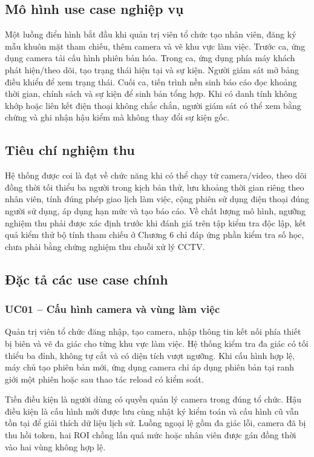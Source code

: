 \subsection{Mô hình use case nghiệp vụ}
Một luồng điển hình bắt đầu khi quản trị viên tổ chức tạo nhân viên, đăng ký mẫu khuôn mặt tham chiếu, thêm camera và vẽ khu vực làm việc. Trước ca, ứng dụng camera tải cấu hình phiên bản hóa. Trong ca, ứng dụng phía máy khách phát hiện/theo dõi, tạo trạng thái hiện tại và sự kiện. Người giám sát mở bảng điều khiển để xem trạng thái. Cuối ca, tiến trình nền sinh báo cáo đọc khoảng thời gian, chính sách và sự kiện để sinh bản tổng hợp. Khi có danh tính không khớp hoặc liên kết điện thoại không chắc chắn, người giám sát có thể xem bằng chứng và ghi nhận hậu kiểm mà không thay đổi sự kiện gốc.

\subsection{Tiêu chí nghiệm thu}
Hệ thống được coi là đạt về chức năng khi có thể chạy từ camera/video, theo dõi đồng thời tối thiểu ba người trong kịch bản thử, lưu khoảng thời gian riêng theo nhân viên, tính đúng phép giao lịch làm việc, cộng phiên sử dụng điện thoại đúng người sử dụng, áp dụng hạn mức và tạo báo cáo. Về chất lượng mô hình, ngưỡng nghiệm thu phải được xác định trước khi đánh giá trên tập kiểm tra độc lập, kết quả kiểm thử bộ tính tham chiếu ở Chương 6 chỉ đáp ứng phần kiểm tra số học, chưa phải bằng chứng nghiệm thu chuỗi xử lý CCTV.

\subsection{Đặc tả các use case chính}
\subsubsection{UC01 -- Cấu hình camera và vùng làm việc}
Quản trị viên tổ chức đăng nhập, tạo camera, nhập thông tin kết nối phía thiết bị biên và vẽ đa giác cho từng khu vực làm việc. Hệ thống kiểm tra đa giác có tối thiểu ba đỉnh, không tự cắt và có diện tích vượt ngưỡng. Khi cấu hình hợp lệ, máy chủ tạo phiên bản mới, ứng dụng camera chỉ áp dụng phiên bản tại ranh giới một phiên hoặc sau thao tác reload có kiểm soát.

Tiền điều kiện là người dùng có quyền quản lý camera trong đúng tổ chức. Hậu điều kiện là cấu hình mới được lưu cùng nhật ký kiểm toán và cấu hình cũ vẫn tồn tại để giải thích dữ liệu lịch sử. Luồng ngoại lệ gồm đa giác lỗi, camera đã bị thu hồi token, hai ROI chồng lấn quá mức hoặc nhân viên được gán đồng thời vào hai vùng không hợp lệ.

